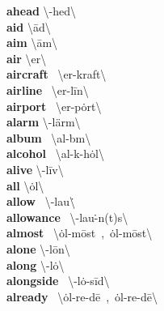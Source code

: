 \documentclass[10pt,a4paper]{article}
\begin{document}
\begin{multicols}{2}
\textbf{ ahead }\quad \textbackslash \textschwa -\textprimstress hed\textbackslash \\
\textbf{ aid }\quad \textbackslash \textprimstress \={a}d\textbackslash \\
\textbf{ aim }\quad \textbackslash \textprimstress \={a}m\textbackslash \\
\textbf{ air }\quad \textbackslash \textprimstress er\textbackslash \\
\textbf{ aircraft }\quad \ \textbackslash \textprimstress er-\textsecstress kraft\textbackslash \\
\textbf{ airline }\quad \ \textbackslash \textprimstress er-\textsecstress l\={i}n\textbackslash \\
\textbf{ airport }\quad \ \textbackslash \textprimstress er-\textsecstress p\.{o}rt\textbackslash \\
\textbf{ alarm }\quad \textbackslash \textschwa -\textprimstress l\"{a}rm\textbackslash \\
\textbf{ album }\quad \ \textbackslash \textprimstress al-b\textschwa m\textbackslash \\
\textbf{ alcohol }\quad \ \textbackslash \textprimstress al-k\textschwa -\textsecstress h\.{o}l\textbackslash \\
\textbf{ alive }\quad \textbackslash \textschwa -\textprimstress l\={i}v\textbackslash \\
\textbf{ all }\quad \textbackslash \textprimstress \.{o}l\textbackslash \\
\textbf{ allow }\quad \ \textbackslash \textschwa -\textprimstress lau\. \textbackslash \\
\textbf{ allowance }\quad \ \textbackslash \textschwa -\textprimstress lau\. -\textschwa n(t)s\textbackslash \\
\textbf{ almost }\quad \ \textbackslash \textprimstress \.{o}l-\textsecstress m\={o}st\ ,\ \.{o}l-\textprimstress m\={o}st\textbackslash \\
\textbf{ alone }\quad \textbackslash \textschwa -\textprimstress l\={o}n\textbackslash \\
\textbf{ along }\quad \textbackslash \textschwa -\textprimstress l\.{o}\engma \textbackslash \\
\textbf{ alongside }\quad \ \textbackslash \textschwa -\textprimstress l\.{o}\engma -\textprimstress s\={i}d\textbackslash \\
\textbf{ already }\quad \ \textbackslash \.{o}l-\textprimstress re-d\={e}\ ,\ \textprimstress \.{o}l-\textsecstress re-d\={e}\textbackslash \\

\end{multicols}
\end{document}
